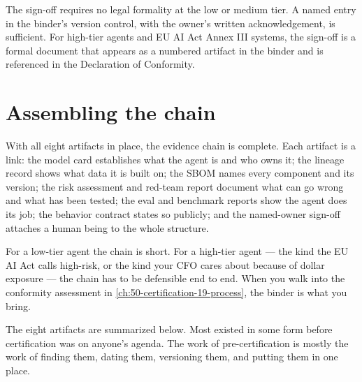 The sign-off requires no legal formality at the low or medium tier. A named entry in the binder's version control, with the owner's written acknowledgement, is sufficient. For high-tier agents and EU AI Act Annex III systems, the sign-off is a formal document that appears as a numbered artifact in the binder and is referenced in the Declaration of Conformity.

\section{Assembling the chain}

With all eight artifacts in place, the evidence chain is complete. Each artifact is a link: the model card establishes what the agent is and who owns it; the lineage record shows what data it is built on; the SBOM names every component and its version; the risk assessment and red-team report document what can go wrong and what has been tested; the eval and benchmark reports show the agent does its job; the behavior contract states so publicly; and the named-owner sign-off attaches a human being to the whole structure.

For a low-tier agent the chain is short. For a high-tier agent --- the kind the EU AI Act calls high-risk, or the kind your CFO cares about because of dollar exposure --- the chain has to be defensible end to end. When you walk into the conformity assessment in \autoref{ch:50-certification-19-process}, the binder is what you bring.

The eight artifacts are summarized below. Most existed in some form before certification was on anyone's agenda. The work of pre-certification is mostly the work of finding them, dating them, versioning them, and putting them in one place.

